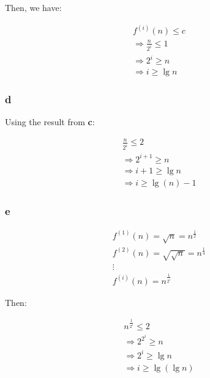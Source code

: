\documentclass[8pt,a4paper]{article}
\begin{document}
  Then, we have:

\begin{equation*}
  \begin{split}
    f^{(i)}(n) \leq c \\
    \Rightarrow \frac{n}{2^{i}} \leq 1 \\
    \Rightarrow 2^{i} \geq n \\
    \Rightarrow i \geq \lg n
  \end{split}
\end{equation*}

\subsubsection*{d}

  Using the result from \textbf{c}:

\begin{equation*}
  \begin{split}
    \frac{n}{2^{i}} \leq 2 \\
    \Rightarrow 2^{i + 1} \geq n \\
    \Rightarrow i + 1 \geq \lg n \\
    \Rightarrow i \geq \lg(n) - 1
  \end{split}
\end{equation*}

\subsubsection*{e}

\begin{equation*}
  \begin{split}
    f^{(1)}(n) = \sqrt{n} = n^{\frac{1}{2}} \\
    f^{(2)}(n) = \sqrt{\sqrt{n}} = n^{\frac{1}{4}} \\
    \vdots \\
    f^{(i)}(n) = n^{\frac{1}{2^{i}}}
  \end{split}
\end{equation*}

  Then:

\begin{equation*}
  \begin{split}
    n^{\frac{1}{2^{i}}} \leq 2 \\
    \Rightarrow 2^{2^{i}} \geq n \\
    \Rightarrow 2^{i} \geq \lg n \\
    \Rightarrow i \geq \lg(\lg n)
  \end{split}
\end{equation*}
\end{document}
